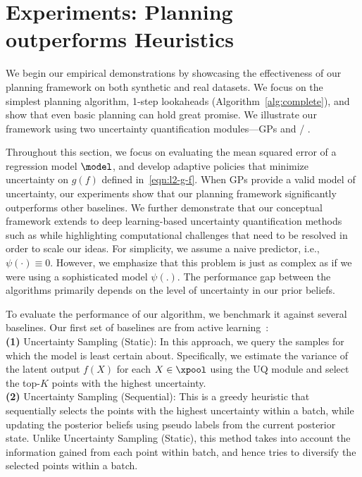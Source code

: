 \section{Experiments: Planning outperforms Heuristics}
\label{sec:experiment}

We begin our empirical demonstrations by showcasing the effectiveness of our planning framework on both synthetic and real datasets. We focus on the simplest planning algorithm, 1-step lookaheads (Algorithm~\ref{alg:complete}), and show that even basic planning can hold great promise. 
We illustrate our framework using two uncertainty quantification modules---GPs and 
\ensembles/ \ensembleplus. 

Throughout this section, we focus on evaluating the mean squared error of 
a regression model $\model$,  and develop adaptive policies that minimize uncertainty on $g(f)$ defined in~\eqref{eqn:l2-g-f}.
When GPs provide a valid model of uncertainty, 
our experiments show that our planning framework significantly outperforms other baselines. 
We further demonstrate that our conceptual framework extends to deep learning-based uncertainty quantification methods such as  \ensembleplus while highlighting computational challenges that need to be resolved in order to scale our ideas. 
For simplicity, we assume a naive predictor, i.e., $\psi(\cdot) \equiv 0$. However, we emphasize that this problem is just as complex as if we were using a sophisticated model $\psi(.)$. The performance gap between the algorithms 
primarily depends
on the level  of uncertainty in our prior beliefs.

To evaluate the performance of our algorithm, we benchmark it against several baselines. 
Our first set of baselines are from active learning~\citep{AggarwalKoGuHaPh14}:
\\ %
\textbf{(1)} 
\textsf{Uncertainty Sampling (Static):}  In this approach, we query the samples for which the model is least certain about. Specifically, we estimate the variance of the latent output $f(X)$ for each $X \in \xpool$ using the UQ module and select the top-$K$ points with the highest uncertainty. \\
\textbf{(2)} \textsf{Uncertainty Sampling (Sequential):} This is a greedy heuristic that sequentially selects the points with the highest uncertainty within a batch, while updating the posterior beliefs using pseudo labels from the current posterior state. Unlike \textsf{Uncertainty Sampling (Static)}, this method takes into account the information gained from each point within batch, and hence tries to diversify the selected points within a batch. 

